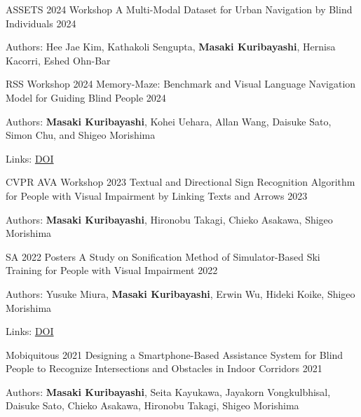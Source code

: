 \begin{cventries}
  \cventry
    {ASSETS 2024 Workshop}
    {A Multi-Modal Dataset for Urban Navigation by Blind Individuals}
    {}
    {2024}
    {
      \begin{cvitems}
        \item {Authors: Hee Jae Kim, Kathakoli Sengupta, \textbf{Masaki Kuribayashi}, Hernisa Kacorri, Eshed Ohn-Bar}
      \end{cvitems}
    }

  \cventry
    {RSS Workshop 2024}
    {Memory-Maze: Benchmark and Visual Language Navigation Model for Guiding Blind People}
    {}
    {2024}
    {
      \begin{cvitems}
        \item {Authors: \textbf{Masaki Kuribayashi}, Kohei Uehara, Allan Wang, Daisuke Sato, Simon Chu, and Shigeo Morishima}
        \item {Links: \href{https://ieeexplore.ieee.org/document/11181068/}{DOI}}
      \end{cvitems}
    }

  \cventry
    {CVPR AVA Workshop 2023}
    {Textual and Directional Sign Recognition Algorithm for People with Visual Impairment by Linking Texts and Arrows}
    {}
    {2023}
    {
      \begin{cvitems}
        \item {Authors: \textbf{Masaki Kuribayashi}, Hironobu Takagi, Chieko Asakawa, Shigeo Morishima}
      \end{cvitems}
    }

  \cventry
    {SA 2022 Posters}
    {A Study on Sonification Method of Simulator-Based Ski Training for People with Visual Impairment}
    {}
    {2022}
    {
      \begin{cvitems}
        \item {Authors: Yusuke Miura, \textbf{Masaki Kuribayashi}, Erwin Wu, Hideki Koike, Shigeo Morishima}
        \item {Links: \href{https://doi.org/10.1145/3550082.3564172}{DOI}}
      \end{cvitems}
    }

  \cventry
    {Mobiquitous 2021}
    {Designing a Smartphone-Based Assistance System for Blind People to Recognize Intersections and Obstacles in Indoor Corridors}
    {}
    {2021}
    {
      \begin{cvitems}
        \item {Authors: \textbf{Masaki Kuribayashi}, Seita Kayukawa, Jayakorn Vongkulbhisal, Daisuke Sato, Chieko Asakawa, Hironobu Takagi, Shigeo Morishima}
      \end{cvitems}
    }

\end{cventries}
